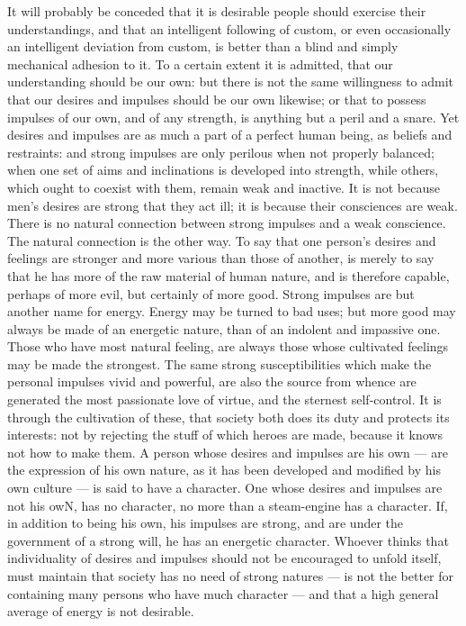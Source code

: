 \documentclass[12pt]{report}
\begin{document}
It will probably be conceded that it is desirable people should exercise their understandings, and that an intelligent following of custom, or even occasionally an intelligent deviation from custom, is better than a blind and simply mechanical adhesion to it. To a certain extent it is admitted, that our understanding should be our own: but there is not the same willingness to admit that our desires and impulses should be our own likewise; or that to possess impulses of our own, and of any strength, is anything but a peril and a snare. Yet desires and impulses are as much a part of a perfect human being, as beliefs and restraints: and strong impulses are only perilous when not properly balanced; when one set of aims and inclinations is developed into strength, while others, which ought to coexist with them, remain weak and inactive. It is not because men's desires are strong that they act ill; it is because their consciences are weak. There is no natural connection between strong impulses and a weak conscience. The natural connection is the other way. To say that one person's desires and feelings are stronger and more various than those of another, is merely to say that he has more of the raw material of human nature, and is therefore capable, perhaps of more evil, but certainly of more good. Strong impulses are but another name for energy. Energy may be turned to bad uses; but more good may always be made of an energetic nature, than of an indolent and impassive one. Those who have most natural feeling, are always those whose cultivated feelings may be made the strongest. The same strong susceptibilities which make the personal impulses vivid and powerful, are also the source from whence are generated the most passionate love of virtue, and the sternest self-control. It is through the cultivation of these, that society both does its duty and protects its interests: not by rejecting the stuff of which heroes are made, because it knows not how to make them. A person whose desires and impulses are his own — are the expression of his own nature, as it has been developed and modified by his own culture — is said to have a character. One whose desires and impulses are not his owN, has no character, no more than a steam-engine has a character. If, in addition to being his own, his impulses are strong, and are under the government of a strong will, he has an energetic character. Whoever thinks that individuality of desires and impulses should not be encouraged to unfold itself, must maintain that society has no need of strong natures — is not the better for containing many persons who have much character — and that a high general average of energy is not desirable.
\end{document}

